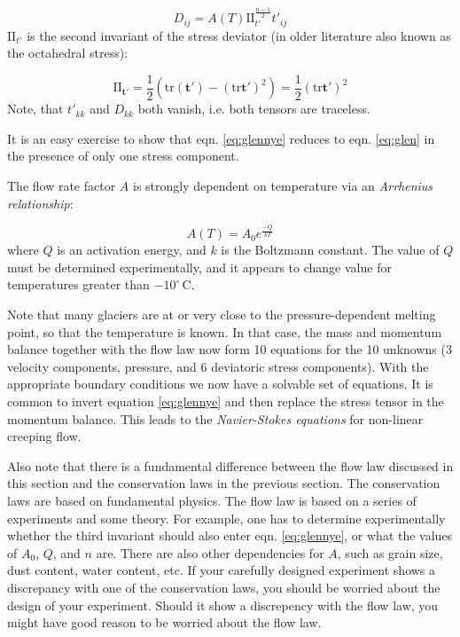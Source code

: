 \documentclass[12pt, openany]{memoir}
\newcommand{\cels}[1]{\ensuremath{#1^{\circ}\,\mathrm{C}}}
\begin{document}
\begin{equation} \label{eq:glennye}
D_{ij} = A(T) \mathrm{II}_{t'}^\frac{n-1}{2} t'_{ij}
\end{equation}
$\mathrm{II}_{t'}$ is the second invariant of the stress deviator (in
older literature also known as the octahedral stress):

\begin{equation}
\mathrm{II}_\mathbf{t'} = \frac{1}{2} \left( \mathrm{tr}( \mathbf{t'})
- (\mathrm{tr}\mathbf{t'})^2 \right) = \frac{1}{2}
(\mathrm{tr}\mathbf{t'})^2 
\end{equation}
Note, that $t'_{kk}$ and $D_{kk}$ both vanish, i.e. both tensors are
traceless. 

It is an easy exercise to show that eqn. \ref{eq:glennye} reduces to
eqn. \ref{eq:glen} in the presence of only one stress component. 

The flow rate factor $A$ is strongly dependent on temperature via an
\emph{Arrhenius relationship}:

\begin{equation}
A(T) = A_0 e^\frac{-Q}{kT}
\end{equation}
where $Q$ is an activation energy, and $k$ is the Boltzmann
constant. The value of $Q$ must be determined experimentally, and it
appears to change value for temperatures greater than \cels{-10}.

Note that many glaciers are at or very close to the pressure-dependent
melting point, so that the temperature is known. In that case, the
mass and momentum balance together with the flow law now form 10
equations for the 10 unknowns (3 velocity components, pressure, and 6
deviatoric stress components). With the appropriate boundary
conditions we now have a solvable set of equations. It is common to
invert equation \ref{eq:glennye} and then replace the stress tensor in
the momentum balance. This leads to the \emph{Navier-Stokes equations}
for non-linear creeping flow.

Also note that there is a fundamental difference between the flow law
discussed in this section and the conservation laws in the previous
section. The conservation laws are based on fundamental physics. The
flow law is based on a series of experiments and some theory. For
example, one has to determine experimentally whether the third
invariant should also enter eqn. \ref{eq:glennye}, or what the values
of $A_0$, $Q$, and $n$ are. There are also other dependencies for $A$,
such as grain size, dust content, water content, etc. If your
carefully designed experiment shows a discrepancy with one of the
conservation laws, you should be worried about the design of your
experiment. Should it show a discrepency with the flow law, you might
have good reason to be worried about the flow law. 
\end{document}
